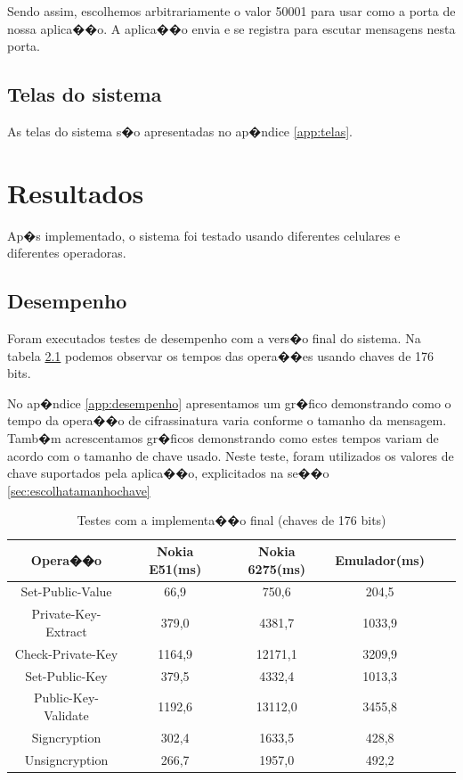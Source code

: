 \documentclass[a4paper,capchap,espacoduplo,normaltoc]{abntepusp}
\begin{document}
Sendo assim, escolhemos arbitrariamente o valor 50001 para usar como a porta de nossa aplica��o. A aplica��o envia e se registra para escutar mensagens nesta porta.

\section{Telas do sistema}
As telas do sistema s�o apresentadas no ap�ndice \ref{app:telas}.


\chapter{Resultados}
Ap�s implementado, o sistema foi testado usando diferentes celulares e diferentes operadoras. 
\section{Desempenho}

Foram executados testes de desempenho com a vers�o final do sistema. Na tabela \ref{tab:bdcps176final} podemos observar os tempos das opera��es usando chaves de 176 bits.

No ap�ndice \ref{app:desempenho} apresentamos um gr�fico demonstrando como o tempo da opera��o de cifrassinatura varia conforme o tamanho da mensagem. Tamb�m acrescentamos gr�ficos demonstrando como estes tempos variam de acordo com o tamanho de chave usado. Neste teste, foram utilizados os valores de chave suportados pela aplica��o, explicitados na se��o \ref{sec:escolhatamanhochave}

\begin{table}[h]\centering
\caption{Testes com a implementa��o final (chaves de 176 bits)} \label{tab:bdcps176final}
\begin{tabular}{cccccc}\hline
Opera��o                   & Nokia E51(ms)   &  Nokia 6275(ms) & Emulador(ms)\\\hline
Set-Public-Value	&	66,9	& 750,6  & 204,5	 \\\hline
Private-Key-Extract &	379,0 &	4381,7 &	1033,9 \\\hline
Check-Private-Key	& 1164,9	& 12171,1  & 3209,9	 \\\hline
Set-Public-Key	& 379,5 &	4332,4 &	1013,3 \\\hline
Public-Key-Validate	&	1192,6 &	13112,0 & 3455,8 \\\hline
Signcryption	&302,4 &	1633,5 & 	428,8 \\\hline
Unsigncryption	&	266,7 &	1957,0 & 492,2 \\\hline
\end{tabular}
\end{table}
\end{document}
